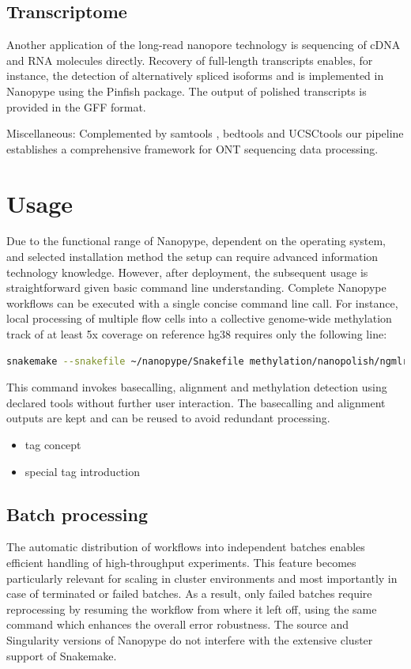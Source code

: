 \subsection{Transcriptome}
\label{subsec:nanopype:transcriptom}
Another application of the long-read nanopore technology is sequencing of cDNA and RNA molecules directly. Recovery of full-length transcripts enables, for instance, the detection of alternatively spliced isoforms and is implemented in Nanopype using the Pinfish package. The output of polished transcripts is provided in the GFF format.


Miscellaneous: Complemented by samtools \cite{Li2009}, bedtools \cite{Quinlan2010} and UCSCtools \cite{Kent2010} our pipeline establishes a comprehensive framework for ONT sequencing data processing.




\section{Usage}
\label{sec:nanopype:usage}
Due to the functional range of Nanopype, dependent on the operating system, and selected installation method the setup can require advanced information technology knowledge. However, after deployment, the subsequent usage is straightforward given basic command line understanding. Complete Nanopype workflows can be executed with a single concise command line call. For instance, local processing of multiple flow cells into a collective genome-wide methylation track of at least 5x coverage on reference hg38 requires only the following line:

\begin{lstlisting}[language=sh, caption=Snakemake example]
snakemake --snakefile ~/nanopype/Snakefile methylation/nanopolish/ngmlr/guppy/sample.5x.hg38.bw
\end{lstlisting}

This command invokes basecalling, alignment and methylation detection using declared tools without further user interaction. The basecalling and alignment outputs are kept and can be reused to avoid redundant processing.

\begin{itemize}
	\item tag concept
	\item special tag introduction
\end{itemize}

\subsection{Batch processing}
The automatic distribution of workflows into independent batches enables efficient handling of high-throughput experiments. This feature becomes particularly relevant for scaling in cluster environments and most importantly in case of terminated or failed batches. As a result, only failed batches require reprocessing by resuming the workflow from where it left off, using the same command which enhances the overall error robustness.
The source and Singularity versions of Nanopype do not interfere with the extensive cluster support of Snakemake.

